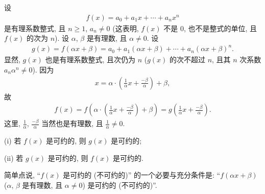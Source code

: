 \begin{proposition}
    设
    \begin{align*}
        f(x) = a_0 + a_1 x + \cdots + a_n x^n
    \end{align*}
    是有理系数整式, 且 $n \geq 1$, $a_n \neq 0$ (这表明, $f(x)$ 不是 $0$, 也不是整式的单位, 且 $f(x)$ 的次为 $n$). 设 $\alpha$, $\beta$ 是有理数, 且 $\alpha \neq 0$. 设
    \begin{align*}
        g(x) = f(\alpha x + \beta) = a_0 + a_1 (\alpha x + \beta) + \cdots + a_n (\alpha x + \beta)^n.
    \end{align*}
    显然, $g(x)$ 也是有理系数整式, 且次仍为 $n$ ($g(x)$ 的次不超过 $n$, 且其 $n$ 次系数 $a_n \alpha^n \neq 0$). 因为
    \begin{align*}
        x = \alpha \cdot \left( \frac{1}{\alpha} x + \frac{-\beta}{\alpha} \right) + \beta,
    \end{align*}
    故
    \begin{align*}
        f(x) = f\left( \alpha \cdot \left( \frac{1}{\alpha} x + \frac{-\beta}{\alpha} \right) + \beta \right) = g\left( \frac{1}{\alpha} x + \frac{-\beta}{\alpha} \right).
    \end{align*}
    这里, $\frac{1}{\alpha}$, $\frac{-\beta}{\alpha}$ 当然也是有理数, 且 $\frac{1}{\alpha} \neq 0$.

    (i) 若 $f(x)$ 是可约的, 则 $g(x)$ 是可约的;

    (ii) 若 $g(x)$ 是可约的, 则 $f(x)$ 是可约的.

    简单点说, ``$f(x)$ 是可约的 (不可约的)'' 的一个必要与充分条件是: ``$f(\alpha x + \beta)$ ($\alpha$, $\beta$ 是有理数, 且 $\alpha \neq 0$) 是可约的 (不可约的)''.
\end{proposition}

